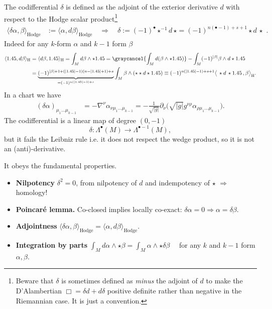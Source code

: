\begin{mytheorem}
%
The codifferential \(\delta\) is defined as the adjoint of the exterior derivative \(d\) with respect to the Hodge scalar product\footnote{Beware that $\delta$ is sometimes defined as \emph{minus} the adjoint of $d$ to make the D'Alambertian $\Box =\delta d+d\delta$ positive definite rather than negative in the Riemannian case. It is just a convention.}
\begin{align}
    \langle \delta \alpha, \beta \rangle_{\mathrm{Hodge}} &:= \langle \alpha, d \beta \rangle_{\mathrm{Hodge}} \quad \Rightarrow \quad \delta := (-1)^{\bullet} \star^{-1}d\,\star = (-1)^{n(\bullet-1)+s+1} \star d \,\star\,\,.
\end{align}
Indeed for any  $k$-form \(\alpha\) and $k\!-\!1$ form \(\beta\)
\begin{align}
    \langle \alpha, d\beta \rangle_{\mathrm{H}} 
    &= \langle d \beta, \alpha \rangle_{\mathrm{H}}
    = \int_M d \beta \wedge \star \alpha
    = \graycancel{\int_M d(\beta \wedge \star \alpha)} - \int_M (-1)^{|\beta|} \beta \wedge d\star \alpha
    \\
    &=
    \underbrace{(-1)^{|\beta|+1+(|\alpha|-1)(n-|\alpha|+1)+s}}_{=(-1)^{n(|\alpha|-1)+s}} \int_M  \beta \wedge (\star\star d\star \alpha)
    \equiv
    (-1)^{n(|\alpha|-1)+s+1} \big\langle\, \star d\,\star \alpha\,, \beta \big\rangle_{\mathrm{H}}.  
\end{align}
In a chart we have
\begin{align}
    (\delta \alpha)_{\mu_1 \dots \mu_{k-1}} 
    &= - \nabla^{\nu} \alpha_{\nu \mu_1 \dots \mu_{k-1}} 
    = - \frac{1}{\sqrt{|g|}} \partial_{\nu} \Big(\sqrt{|g|} g^{\nu \rho} \alpha_{\rho \mu_1 \dots \mu_{k-1}}\Big).
\end{align}
The codifferential is a linear map of degree \((0,-1)\)
\begin{equation}
    \delta: \Lambda^\bullet (M) \to \Lambda^{\bullet-1} (M),
\end{equation}
but it fails the Leibniz rule i.e. it does not respect the wedge product, so it is not an (anti)-derivative.


\smallskip

\noindent
It obeys the fundamental properties.
\begin{itemize}
    \item \textbf{Nilpotency} \(\delta^2 = 0\), from nilpotency of $d$ and indempotency of $\star$ $\Rightarrow$ homology!
    \item \textbf{Poincaré lemma.} Co-closed implies locally co-exact: \(\delta \alpha = 0 \Rightarrow \alpha = \delta \beta\).
    \item \textbf{Adjointness} \(\langle \delta \alpha, \beta \rangle_{\mathrm{Hodge}} = \langle \alpha, d \beta \rangle_{\mathrm{Hodge}}\).
    \item \textbf{Integration by parts} $\displaystyle \int_M d\alpha \wedge \star \beta = \int_M \alpha \wedge \star \delta \beta \quad $ for any \(k\) and $k\!-\!1$ form \(\alpha,\beta\).


\end{itemize}
\end{mytheorem}
